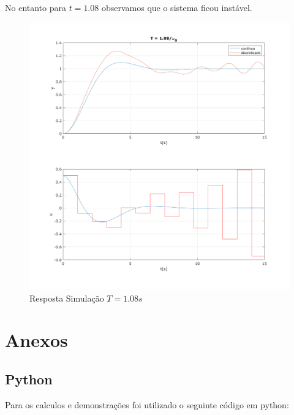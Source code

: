 \documentclass[a4paper,11pt]{article}
\begin{document}
No entanto para $t=1.08$ observamos que o sistema ficou instável.

\begin{figure}[H]
    \centering
    \includegraphics[width=0.8\linewidth]{img/exsim2-plot-sim-t108.png}
    \caption{Resposta Simulação $T=1.08s$}
\end{figure}





\nocite{sympy}

\newpage
\section{Anexos}
\subsection{Python}

Para os calculos e demonstrações foi utilizado o seguinte código em python:

\inputminted[xleftmargin=15pt,linenos,frame=single,framesep=5pt]{python}{../python/exsim2.py}
\end{document}
